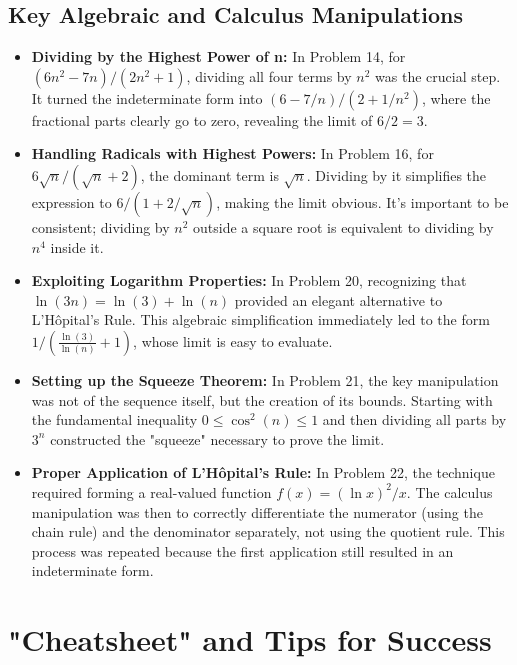 \documentclass{article}
\begin{document}
\subsection{Key Algebraic and Calculus Manipulations}
\begin{itemize}
    \item \textbf{Dividing by the Highest Power of n:} In Problem 14, for $(6n^2 - 7n) / (2n^2 + 1)$, dividing all four terms by $n^2$ was the crucial step. It turned the indeterminate form into $(6 - 7/n) / (2 + 1/n^2)$, where the fractional parts clearly go to zero, revealing the limit of $6/2 = 3$.

    \item \textbf{Handling Radicals with Highest Powers:} In Problem 16, for $6\sqrt{n} / (\sqrt{n} + 2)$, the dominant term is $\sqrt{n}$. Dividing by it simplifies the expression to $6 / (1 + 2/\sqrt{n})$, making the limit obvious. It's important to be consistent; dividing by $n^2$ outside a square root is equivalent to dividing by $n^4$ inside it.

    \item \textbf{Exploiting Logarithm Properties:} In Problem 20, recognizing that $\ln(3n) = \ln(3) + \ln(n)$ provided an elegant alternative to L'Hôpital's Rule. This algebraic simplification immediately led to the form $1 / (\frac{\ln(3)}{\ln(n)} + 1)$, whose limit is easy to evaluate.

    \item \textbf{Setting up the Squeeze Theorem:} In Problem 21, the key manipulation was not of the sequence itself, but the creation of its bounds. Starting with the fundamental inequality $0 \le \cos^2(n) \le 1$ and then dividing all parts by $3^n$ constructed the "squeeze" necessary to prove the limit.

    \item \textbf{Proper Application of L'Hôpital's Rule:} In Problem 22, the technique required forming a real-valued function $f(x) = (\ln x)^2 / x$. The calculus manipulation was then to correctly differentiate the numerator (using the chain rule) and the denominator separately, not using the quotient rule. This process was repeated because the first application still resulted in an indeterminate form.
\end{itemize}

\section{"Cheatsheet" and Tips for Success}
\end{document}
